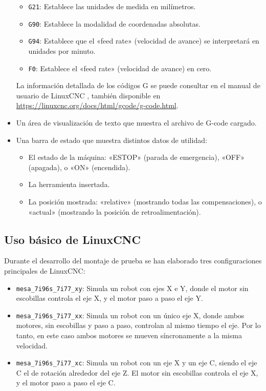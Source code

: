 \documentclass[english,spanish,a4paper,11pt]{article}
\begin{document}
\begin{itemize}
\begin{itemize}
        \item \texttt{G21}: Establece las unidades de medida en milímetros.

        \item \texttt{G90}: Establece la modalidad de coordenadas absolutas.

        \item \texttt{G94}: Establece que el «feed rate» (velocidad de avance) se interpretará en unidades por minuto.

        \item \texttt{F0}: Establece el «feed rate» (velocidad de avance) en cero.
    \end{itemize}

    La información detallada de los códigos G se puede consultar en el manual de usuario de LinuxCNC \cite[sección G-Codes]{linuxcncdoc}, también disponible en \url{https://linuxcnc.org/docs/html/gcode/g-code.html}.

    \item Un área de visualización de texto que muestra el archivo de G-code cargado.
    
    \item Una barra de estado que muestra distintos datos de utilidad: 
    \begin{itemize}
        \item El estado de la máquina: «ESTOP» (parada de emergencia), «OFF» (apagada), o «ON» (encendida).

        \item La herramienta insertada.

        \item La posición mostrada: «relative» (mostrando todas las compensaciones), o «actual» (mostrando la posición de retroalimentación).
    \end{itemize}
\end{itemize}


\subsection{Uso básico de LinuxCNC}
\label{sec:linuxcnc_usage}

Durante el desarrollo del montaje de prueba se han elaborado tres configuraciones principales de LinuxCNC:
%
\begin{itemize}
    \item \texttt{mesa\_7i96s\_7i77\_xy}: Simula un robot con ejes X e Y, donde el motor sin escobillas controla el eje X, y el motor paso a paso el eje Y.

    \item \texttt{mesa\_7i96s\_7i77\_xx}: Simula un robot con un único eje X, donde ambos motores, sin escobillas y paso a paso, controlan al mismo tiempo el eje. Por lo tanto, en este caso ambos motores se mueven síncronamente a la misma velocidad.

    \item \texttt{mesa\_7i96s\_7i77\_xc}: Simula un robot con un eje X y un eje C, siendo el eje C el de rotación alrededor del eje Z. El motor sin escobillas controla el eje X, y el motor paso a paso el eje C.
\end{itemize}
\end{document}
